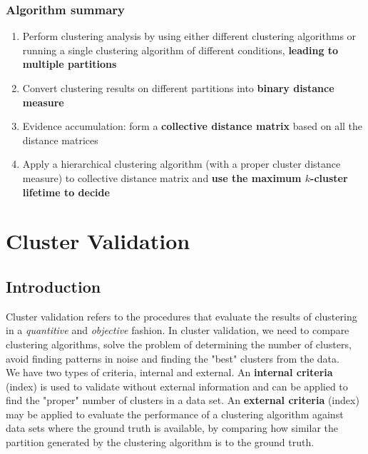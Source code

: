 \documentclass[11pt,fleqn]{book} %
\begin{document}
\subsection*{Algorithm summary}
\begin{enumerate}
	\item Perform clustering analysis by using either different clustering algorithms or running a single clustering algorithm of different conditions, \textbf{leading to multiple partitions}
	\item Convert clustering results on different partitions into \textbf{binary distance measure}
	\item Evidence accumulation: form a \textbf{collective distance matrix} based on all the distance matrices
	\item Apply a hierarchical clustering algorithm (with a proper cluster distance measure) to collective distance matrix and \textbf{use the maximum $k$-cluster lifetime to decide}
\end{enumerate}



\chapter{Cluster Validation}
\section*{Introduction}
Cluster validation refers to the procedures that evaluate the results of clustering in a \textit{quantitive} and \textit{objective} fashion. In cluster validation, we need to compare clustering algorithms, solve the problem of determining the number of clusters, avoid finding patterns in noise and finding the "best" clusters from the data.\\

\noindent
We have two types of criteria, internal and external. An \textbf{internal criteria} (index) is used to validate without external information and can be applied to find the "proper" number of clusters in a data set. An \textbf{external criteria} (index) may be applied to evaluate the performance of a clustering algorithm against data sets where the ground truth is available, by comparing how similar the partition generated by the clustering algorithm is to the ground truth.
\end{document}
